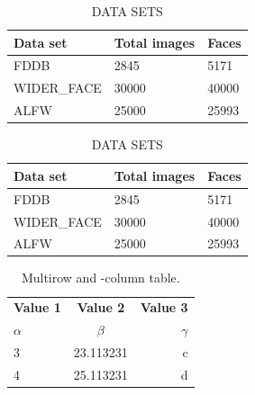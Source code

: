 \documentclass{article}
\begin{document}
\renewcommand\arraystretch{1.5} %
\begin{table}[htbp] %
      \setlength{\abovecaptionskip}{0cm} %
      \setlength{\belowcaptionskip}{0.2cm}
   \centering
   \caption{\label{tab:l2}DATA SETS} 
   \begin{tabular}{p{2.3cm}<{\centering}p{2.3cm}<{\centering}p{2.3cm}<{\centering}} %
      \hline
      Data set& Total images & Faces \\ 
       \hline
      FDDB& 2845 & 5171 \\ 
      WIDER\_FACE& 30000 & 40000 \\  
      ALFW& 25000 & 25993 \\ 
      \hline
   \end{tabular}
   \begin{tabular}{p{2.3cm}<{\centering}p{2.3cm}<{\centering}p{2.3cm}<{\centering}} %
      \hline
      Data set& Total images & Faces \\ 
       \hline
      FDDB& 2845 & 5171 \\ 
      WIDER\_FACE& 30000 & 40000 \\  
      ALFW& 25000 & 25993 \\ 
      \hline
   \end{tabular}
\end{table}


\begin{table}[h!]
  \begin{center}
    \caption{Multirow and -column table.}
    \label{tab:table1}
    \begin{tabular}{l|c|r}
      \textbf{Value 1} & \textbf{Value 2} & \textbf{Value 3}\\
      $\alpha$ & $\beta$ & $\gamma$ \\
      3 & 23.113231 & c\\
      4 & 25.113231 & d\\
    \end{tabular}
  \end{center}
\end{table}


\end{document}
